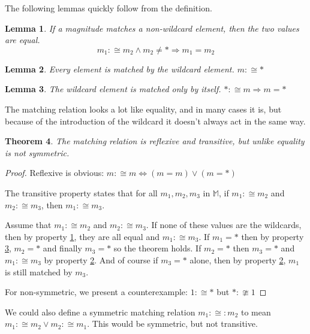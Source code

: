 \documentclass[twoside]{article}
\theoremstyle{plain}%
\newtheorem{theorem}{Theorem}[section]
\newtheorem{lemma}[theorem]{Lemma}
\theoremstyle{definition}
\theoremstyle{remark}
\begin{document}
The following lemmas quickly follow from the definition.

\begin{lemma}
\label{wild_prop_1} If a magnitude matches a non-wildcard element, then the two values are equal. \[m_1 :\cong m_2 \wedge m_2 \neq \ast \Longrightarrow m_1 = m_2\]
\end{lemma}

\begin{lemma}
\label{wild_prop_2}
Every element is matched by the wildcard element. \(m :\cong \ast\)
\end{lemma}

\begin{lemma}
\label{wild_prop_3}
The wildcard element is matched only by itself. \(\ast :\cong m \Longrightarrow m = \ast\)
\end{lemma}

The matching relation looks a lot like equality, and in many cases it is, but because of the introduction of the wildcard it doesn't always act in the same way.

\begin{theorem}
The matching relation is reflexive and transitive, but unlike equality is not symmetric.
\end{theorem}

\begin{proof}
Reflexive is obvious: \(m :\cong m \Longleftrightarrow (m = m) \vee (m = \ast)\)

The transitive property states that for all \(m_1, m_2, m_3\) in \(\mathbb{M}\), if \(m_1 :\cong m_2\) and \(m_2 :\cong m_3\), then \(m_1 :\cong m_3\).

Assume that \(m_1 :\cong m_2\) and \(m_2 :\cong m_3\). If none of these values are the wildcards, then by property \ref{wild_prop_1}, they are all equal and \(m_1 :\cong m_3\). If \(m_1 = \ast\) then by property \ref{wild_prop_3}, \(m_2 = \ast\) and finally \(m_3 = \ast\) so the theorem holds. If \(m_2 = \ast\) then \(m_3 = \ast\) and \(m_1 :\cong m_3\) by property \ref{wild_prop_2}. And of course if \(m_3 = \ast\) alone, then by property \ref{wild_prop_2}, \(m_1\) is still matched by \(m_3\).

For non-symmetric, we present a counterexample: \(1 :\cong \ast\) but \(\ast :\ncong 1\)
\end{proof}

We could also define a symmetric matching relation \(m_1 :\cong: m_2\) to mean \(m_1 :\cong m_2 \vee m_2 :\cong m_1\). This would be symmetric, but not transitive.
\end{document}
